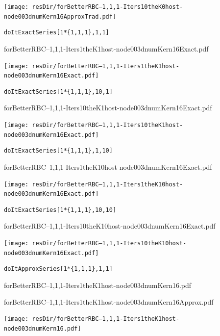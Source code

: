 \documentclass[12pt]{article}
\begin{document}
  \texttt{[image: resDir/forBetterRBC--1,1,1-Iters10theK0host-node003dnumKern16ApproxTrad.pdf]}
\fi

\newpage
\begin{verbatim}
doItExactSeries[1*{1,1,1},1,1]
\end{verbatim}

forBetterRBC--1,1,1-Iters1theK1host-node003dnumKern16Exact.pdf



\ifmacosx
  \fi
\iflinux
  \texttt{[image: resDir/forBetterRBC--1,1,1-Iters1theK1host-node003dnumKern16Exact.pdf]}
\fi

\newpage
\begin{verbatim}
doItExactSeries[1*{1,1,1},10,1]
\end{verbatim}

forBetterRBC--1,1,1-Iters10theK1host-node003dnumKern16Exact.pdf



\ifmacosx
  \fi
\iflinux
  \texttt{[image: resDir/forBetterRBC--1,1,1-Iters10theK1host-node003dnumKern16Exact.pdf]}
\fi



\newpage
\begin{verbatim}
doItExactSeries[1*{1,1,1},1,10]
\end{verbatim}

forBetterRBC--1,1,1-Iters1theK10host-node003dnumKern16Exact.pdf



\ifmacosx
  \fi
\iflinux
  \texttt{[image: resDir/forBetterRBC--1,1,1-Iters1theK10host-node003dnumKern16Exact.pdf]}
\fi


\newpage
\begin{verbatim}
doItExactSeries[1*{1,1,1},10,10]
\end{verbatim}

forBetterRBC--1,1,1-Iters10theK10host-node003dnumKern16Exact.pdf



\ifmacosx
  \fi
\iflinux
  \texttt{[image: resDir/forBetterRBC--1,1,1-Iters10theK10host-node003dnumKern16Exact.pdf]}
\fi


\newpage
\begin{verbatim}
doItApproxSeries[1*{1,1,1},1,1]
\end{verbatim}

forBetterRBC--1,1,1-Iters1theK1host-node003dnumKern16.pdf


forBetterRBC--1,1,1-Iters1theK1host-node003dnumKern16Approx.pdf


\ifmacosx
  \fi
\iflinux
  \texttt{[image: resDir/forBetterRBC--1,1,1-Iters1theK1host-node003dnumKern16.pdf]}
\end{document}
